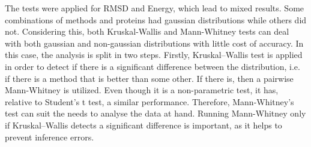 The tests were applied for RMSD and Energy, which lead to mixed results. Some
combinations of methods and proteins had gaussian distributions while others did
not. Considering this, both Kruskal-Wallis and Mann-Whitney tests can deal with
both gaussian and non-gaussian distributions with little cost of accuracy.
%
% 
%
%
In this case, the analysis is split in two steps.
Firstly, Kruskal–Wallis test is applied in order
to detect if there is a significant difference between the distribution, i.e.
if there is a method that is better than some other. If there is, then
a pairwise Mann-Whitney is utilized. Even though it is a non-parametric test, it
has, relative to Student's t test, a similar performance. Therefore,
Mann-Whitney's test can suit the needs to analyse the data at hand. Running
Mann-Whitney only if Kruskal–Wallis detects a significant difference is
important, as it helps to prevent inference errors.

